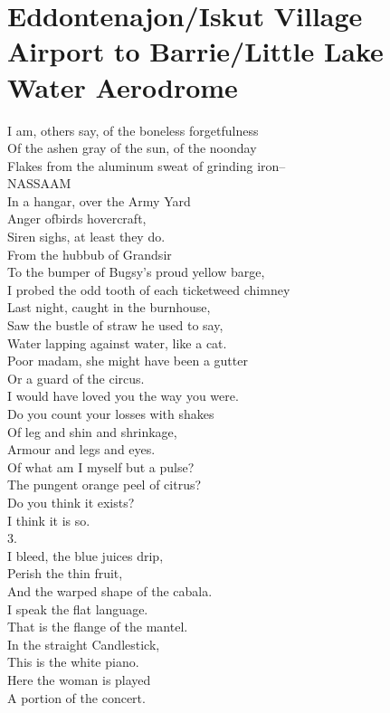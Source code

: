 \documentclass[smalldemyvopaper,11pt,twoside,onecolumn,openright,extrafontsizes]{memoir}
\begin{document}
\chapter{Eddontenajon/Iskut Village Airport to Barrie/Little Lake Water Aerodrome}
I am, others say, of the boneless forgetfulness
\\Of the ashen gray of the sun, of the noonday
\\Flakes from the aluminum sweat of grinding iron--
\\NASSAAM
\\In a hangar, over the Army Yard
\\Anger ofbirds hovercraft,
\\Siren sighs, at least they do.
\\From the hubbub of Grandsir
\\To the bumper of Bugsy's proud yellow barge,
\\I probed the odd tooth of each ticketweed chimney
\\Last night, caught in the burnhouse,
\\Saw the bustle of straw he used to say,
\\Water lapping against water, like a cat.
\\Poor madam, she might have been a gutter
\\Or a guard of the circus.
\\I would have loved you the way you were.
\\Do you count your losses with shakes
\\Of leg and shin and shrinkage,
\\Armour and legs and eyes.
\\Of what am I myself but a pulse?
\\The pungent orange peel of citrus?
\\Do you think it exists?
\\I think it is so.
\\3.
\\I bleed, the blue juices drip,
\\Perish the thin fruit,
\\And the warped shape of the cabala.
\\I speak the flat language.
\\That is the flange of the mantel.
\\In the straight Candlestick,
\\This is the white piano.
\\Here the woman is played
\\A portion of the concert.
\end{document}

